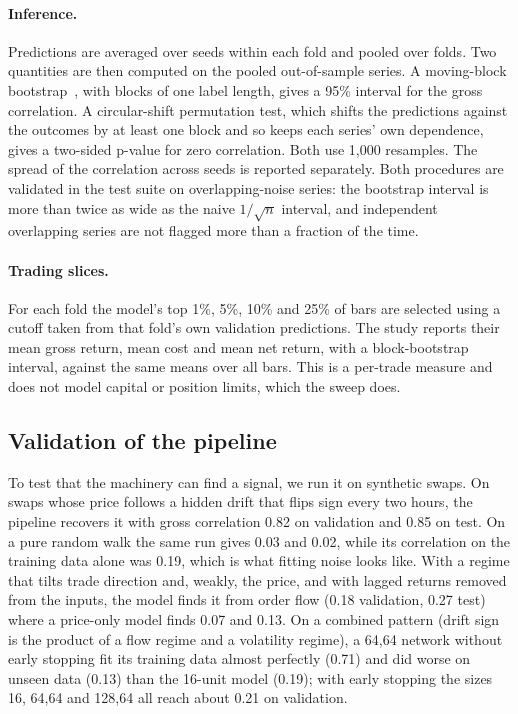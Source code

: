\documentclass[11pt,a4paper]{article}
\begin{document}
\paragraph{Inference.}
Predictions are averaged over seeds within each fold and pooled over folds.
Two quantities are then computed on the pooled out-of-sample series. A
moving-block bootstrap~\cite{kunsch1989}, with blocks of one label length,
gives a 95\% interval for the gross correlation. A circular-shift permutation
test, which shifts the predictions against the outcomes by at least one
block and so keeps each series' own dependence, gives a two-sided p-value
for zero correlation. Both use 1,000 resamples. The spread of the correlation
across seeds is reported separately. Both procedures are validated in the test
suite on overlapping-noise series: the bootstrap interval is more than twice
as wide as the naive $1/\sqrt{n}$ interval, and independent overlapping series
are not flagged more than a fraction of the time.

\paragraph{Trading slices.}
For each fold the model's top 1\%, 5\%, 10\% and 25\% of bars are selected
using a cutoff taken from that fold's own validation predictions. The study
reports their mean gross return, mean cost and mean net return, with a
block-bootstrap interval, against the same means over all bars. This is a
per-trade measure and does not model capital or position limits, which the
sweep does.

\subsection{Validation of the pipeline}

To test that the machinery can find a signal, we run it on synthetic swaps.
On swaps whose price follows a hidden drift that flips sign every two hours,
the pipeline recovers it with gross correlation 0.82 on validation and 0.85 on
test. On a pure random walk the same run gives 0.03 and 0.02, while its
correlation on the training data alone was 0.19, which is what fitting noise
looks like. With a regime that tilts trade direction and, weakly, the price,
and with lagged returns removed from the inputs, the model finds it from
order flow (0.18 validation, 0.27 test) where a price-only model finds
0.07 and 0.13. On a combined pattern (drift sign is the product of a flow
regime and a volatility regime), a 64,64 network without early stopping fit
its training data almost perfectly (0.71) and did worse on unseen data (0.13)
than the 16-unit model (0.19); with early stopping the sizes 16, 64,64 and
128,64 all reach about 0.21 on validation.
\end{document}
